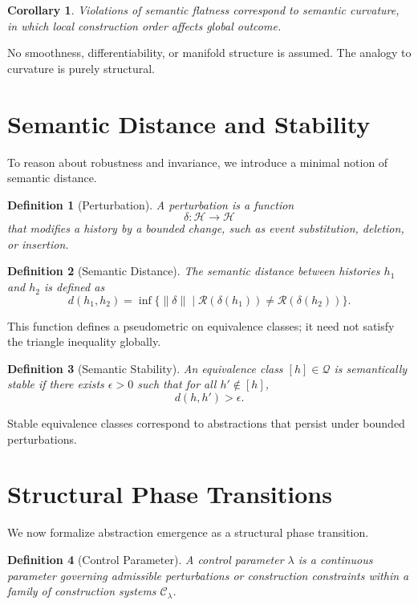 \documentclass[11pt]{article}
\newtheorem{definition}{Definition}[section]
\newtheorem{corollary}{Corollary}[section]
\begin{document}
\begin{corollary}
Violations of semantic flatness correspond to semantic curvature, in which local construction order affects global outcome.
\end{corollary}

No smoothness, differentiability, or manifold structure is assumed. The analogy to curvature is purely structural.

\section{Semantic Distance and Stability}

To reason about robustness and invariance, we introduce a minimal notion of semantic distance.

\begin{definition}[Perturbation]
A perturbation is a function
\[
\delta : \mathcal{H} \to \mathcal{H}
\]
that modifies a history by a bounded change, such as event substitution, deletion, or insertion.
\end{definition}

\begin{definition}[Semantic Distance]
The semantic distance between histories $h_1$ and $h_2$ is defined as
\[
d(h_1, h_2) = \inf \{ \|\delta\| \mid \mathcal{R}(\delta(h_1)) \neq \mathcal{R}(\delta(h_2)) \}.
\]
\end{definition}

This function defines a pseudometric on equivalence classes; it need not satisfy the triangle inequality globally.

\begin{definition}[Semantic Stability]
An equivalence class $[h] \in \mathcal{Q}$ is semantically stable if there exists $\epsilon > 0$ such that for all $h' \notin [h]$,
\[
d(h, h') > \epsilon.
\]
\end{definition}

Stable equivalence classes correspond to abstractions that persist under bounded perturbations.

\section{Structural Phase Transitions}

We now formalize abstraction emergence as a structural phase transition.

\begin{definition}[Control Parameter]
A control parameter $\lambda$ is a continuous parameter governing admissible perturbations or construction constraints within a family of construction systems $\mathcal{C}_\lambda$.
\end{definition}
\end{document}
